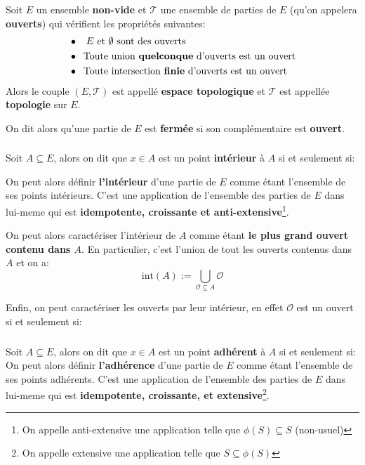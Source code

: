 \chapter*{}

Soit \(E\) un ensemble \textbf{non-vide} et \(\mathcal{T}\) une ensemble de parties de \(E\) (qu'on appelera \textbf{ouverts}) qui vérifient les propriétés suivantes:
\begin{align*}
   &\bullet \;\;\; \text{\(E\) et \(\emptyset\) sont des ouverts} \\
   &\bullet \;\; \text{Toute union \textbf{quelconque} d'ouverts est un ouvert} \\
   &\bullet \;\; \text{Toute intersection \textbf{finie} d'ouverts est un ouvert}
\end{align*}
Alors le couple \((E, \mathcal{T})\) est appellé \textbf{espace topologique} et \(\mathcal{T}\) est appellée \textbf{topologie} sur \(E\).\<

On dit alors qu'une partie de \(E\) est \textbf{fermée} si son complémentaire est \textbf{ouvert}.
\subsection*{}
Soit \(A \subseteq E\), alors on dit que \(x \in A\) est un point \textbf{intérieur} à \(A\) si et seulement si:

On peut alors définir \textbf{l'intérieur} d'une partie de \(E\) comme étant l'ensemble de ses points intérieurs. C'est une application de l'ensemble des parties de \(E\) dans lui-meme qui est \textbf{idempotente, croissante et anti-extensive}\footnote[2]{On appelle anti-extensive une application telle que \(\phi(S) \subseteq S\) (non-usuel)}.\<

On peut alors caractériser l'intérieur de \(A\) comme étant \textbf{le plus grand ouvert contenu dans \(A\)}. En particulier, c'est l'union de tout les ouverts contenus dans \(A\) et on a:
\[
    \text{int}(A) := \bigcup_{\mathcal{O} \subseteq{A}} \mathcal{O}
\]

Enfin, on peut caractériser les ouverts par leur intérieur, en effet \(\mathcal{O}\) est un ouvert si et seulement si:
\subsection*{}
Soit \(A \subseteq E\), alors on dit que \(x \in A\) est un point \textbf{adhérent} à \(A\) si et seulement si:
On peut alors définir \textbf{l'adhérence} d'une partie de \(E\) comme étant l'ensemble de ses points adhérents. C'est une application de l'ensemble des parties de \(E\) dans lui-meme qui est \textbf{idempotente, croissante, et extensive}\footnote[3]{On appelle extensive une application telle que \( S \subseteq \phi(S) \)}.\<

